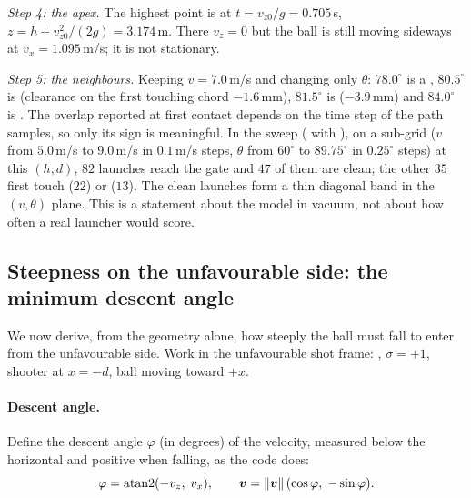 \emph{Step 4: the apex.} The highest point is at $t = v_{z0}/g = 0.705$\,\unit{s}\predicted{},
$z = h + v_{z0}^2/(2g) = 3.174$\,\unit{m}\predicted. There $v_z = 0$ but the ball is still moving
sideways at $v_x = 1.095$\,\unit{m/s}\predicted; it is not stationary.

\emph{Step 5: the neighbours.} Keeping $v = 7.0$\,\unit{m/s}\assumed{} and changing only $\theta$:
$78.0^\circ$\assumed{} is a , $80.5^\circ$\assumed{} is 
(clearance on the first touching chord $-1.6$\,\unit{mm}\predicted), $81.5^\circ$\assumed{} is
 ($-3.9$\,\unit{mm}\predicted) and $84.0^\circ$\assumed{} is
. The overlap reported at first contact depends on the time step of
the path samples, so only its sign is meaningful.
In the sweep ( with ), on a sub-grid
($v$ from $5.0$\,\unit{m/s}\assumed{} to $9.0$\,\unit{m/s}\assumed{} in $0.1$\,\unit{m/s}\assumed{} steps,
$\theta$ from $60^\circ$\assumed{} to $89.75^\circ$\assumed{} in $0.25^\circ$\assumed{} steps) at this
$(h, d)$, $82$\predicted{} launches reach the gate and $47$\predicted{} of them are clean; the other
$35$\predicted{} first touch  ($22$\predicted) or 
($13$\predicted). The clean launches form a thin diagonal band in the $(v, \theta)$ plane. This is a
statement about the model in vacuum, not about how often a real launcher would score.

\subsection{Steepness on the unfavourable side: the minimum descent angle}
\label{sec:geometry-steep}

We now derive, from the geometry alone, how steeply the ball must fall to enter from the
unfavourable side. Work in the unfavourable shot frame: , $\sigma = +1$, shooter
at $x = -d$, ball moving toward $+x$.

\paragraph{Descent angle.} Define the descent angle $\varphi$ (in degrees) of the velocity, measured
below the horizontal and positive when falling, as the code does:
\begin{equation}
  \varphi = \operatorname{atan2}(-v_z,\; v_x), \qquad \bm{v} = \lVert\bm{v}\rVert\,(\cos\varphi,\; -\sin\varphi).
  \label{eq:geometry-descent}
\end{equation}

